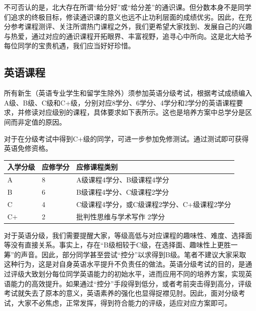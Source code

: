 \vspace{10pt}

不可否认的是，北大存在所谓“给分好”或“给分差”的通识课。但分数本身不是同学们追求的终极目标，修读通识课的意义也远不止功利层面的成绩优劣。因此，在充分参考课程测评、关注所谓热门课程之外，我们更希望大家找到、发展自己的兴趣与热爱，通过对应的通识课程开拓眼界、丰富视野，追寻心中所向。这是北大给予每位同学的宝贵机遇，我们应当好好珍惜。

\subsection{英语课程}
所有新生（英语专业学生和留学生除外）须参加英语分级考试，根据考试成绩编入A级、B级、C级和C+级，分别对应8学分、6学分、4学分和2学分的英语课程要求，并修读对应级别的课程，具体要求如下表所示。这也是培养方案中总学分是区间而非定值的原因。

\vspace{10pt}

对于在分级考试中得到C+级的同学，可进一步参加免修测试。通过测试即可获得英语免修资格。

\begin{table}[htbp]
	\centering
	
	\begin{tabular}{| l | l | l |}
		\hline
		入学分级 & 应修学分 & 应修课程类别 \\
		\hline
		A & 8 & A级课程4学分、B级课程4学分 \\
		\hline
		B & 6 & B级课程4学分、C级课程2学分 \\
		\hline
		C & 4 & C级课程4学分，或C级课程2学分、C+级课程2学分 \\
		\hline
		C$+$  & 2 & 批判性思维与学术写作\hspace{6pt} 2学分 \\
		\hline
		
	\end{tabular}
	
\end{table}

对于英语分级，我们需要提醒大家，等级高低与对应课程的趣味性、难度、选择面等没有直接关系。事实上，存在“B级相较于C级，在选择面、趣味性上更胜一筹”的声音。因此，部分同学甚至尝试“控分”以求得到B级。笔者不建议大家采取这种行为，这是对自身英语水平提升不负责任的做法。英语分级考试的目的，是通过评级大致划分每位同学英语能力的初始水平，进而应用不同的培养方案，实现英语能力的高效提升。如果通过“控分”手段得到低分，或者考前突击得到高分，评级考试就失去了原本的意义，英语素养的强化也显得捉襟见肘。因此，面对分级考试，大家不必焦虑，正常发挥，得到符合能力的评级，适应对应方案即可。

